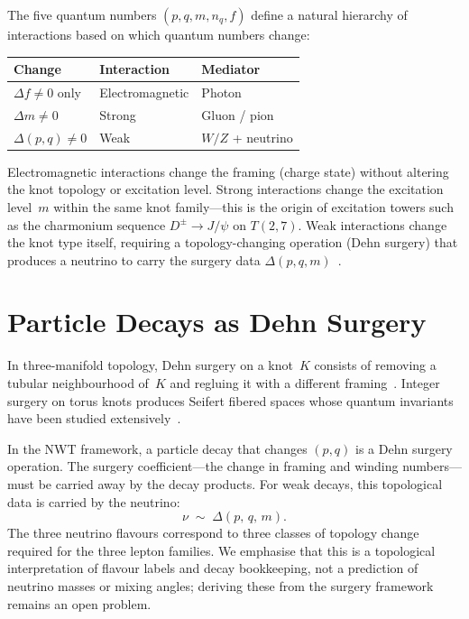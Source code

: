 \documentclass[11pt,a4paper]{article}
\begin{document}
The five quantum numbers $(p, q, m, n_q, f)$ define a natural
hierarchy of interactions based on which quantum numbers change:

\begin{center}
\begin{tabular}{lll}
\toprule
Change & Interaction & Mediator \\
\midrule
$\Delta f \neq 0$ only & Electromagnetic & Photon \\
$\Delta m \neq 0$ & Strong & Gluon / pion \\
$\Delta(p,q) \neq 0$ & Weak & $W/Z$ + neutrino \\
\bottomrule
\end{tabular}
\end{center}

Electromagnetic interactions change the framing (charge state)
without altering the knot topology or excitation level.
Strong interactions change the excitation level~$m$ within the
same knot family---this is the origin of excitation towers
such as the charmonium sequence $D^\pm \to J/\psi$ on
$T(2,7)$.  Weak interactions change the knot type itself,
requiring a topology-changing operation (Dehn surgery) that
produces a neutrino to carry the surgery data
$\Delta(p, q, m)$~\cite{paper6}.


\section{Particle Decays as Dehn Surgery}
\label{sec:surgery}

In three-manifold topology, Dehn surgery on a knot~$K$
consists of removing a tubular neighbourhood of~$K$ and
regluing it with a different framing~\cite{Turaev2010}.
Integer surgery on torus knots produces Seifert fibered
spaces whose quantum invariants have been studied
extensively~\cite{MurakamiTran2022}.

In the NWT framework, a particle decay that changes
$(p,q)$ is a Dehn surgery operation.  The surgery
coefficient---the change in framing and winding
numbers---must be carried away by the decay products.
For weak decays, this topological data is carried by
the neutrino:
\begin{equation}
  \nu \;\sim\; \Delta(p,\, q,\, m).
  \label{eq:neutrino}
\end{equation}
The three neutrino flavours correspond to three classes
of topology change required for the three lepton families.
We emphasise that this is a topological interpretation of
flavour labels and decay bookkeeping, not a prediction of
neutrino masses or mixing angles; deriving these from the
surgery framework remains an open problem.
\end{document}
